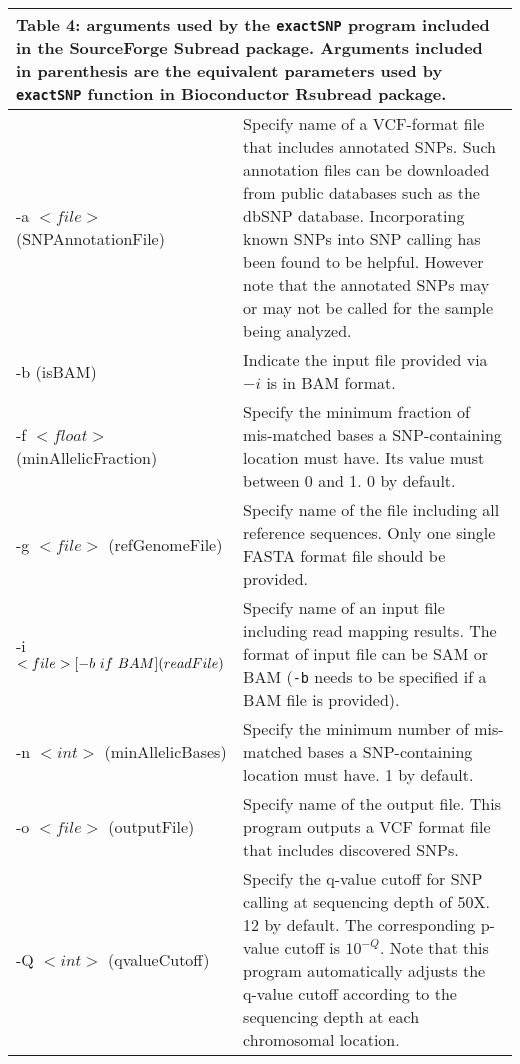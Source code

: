 \documentclass[12pt]{report}
\newcommand{\code}[1]{{\small\texttt{#1}}}
\newcommand{\Subread}{\textsf{Subread}}
\newcommand{\Rsubread}{\textsf{Rsubread}}
\begin{document}
\begin{longtable}{|p{4.5cm}|p{11cm}|}
\multicolumn{2}{p{16cm}}{Table 4: arguments used by the \code{exactSNP} program included in the SourceForge {\Subread} package. 
Arguments included in parenthesis are the equivalent parameters used by \code{exactSNP} function in Bioconductor {\Rsubread} package.}
\endfirsthead
\hline
Arguments & Description \\
\hline
-a $<file>$ \newline (SNPAnnotationFile) & Specify name of a VCF-format file that includes annotated SNPs. Such annotation files can be downloaded from public databases such as the dbSNP database. Incorporating known SNPs into SNP calling has been found to be helpful. However note that the annotated SNPs may or may not be called for the sample being analyzed. \\
\hline
-b \newline (isBAM) & Indicate the input file provided via $-i$ is in BAM format. \\
\hline
-f $<float>$ \newline (minAllelicFraction) & Specify the minimum fraction of mis-matched bases a SNP-containing location must have. Its value must between 0 and 1. 0 by default. \\
\hline
-g $<file>$ \newline (refGenomeFile) & Specify name of the file including all reference sequences. Only one single FASTA format file should be provided. \\
\hline
-i $<file> [-b\ if\ BAM] \newline (readFile)$ & Specify name of an input file including read mapping results. The format of input file can be SAM or BAM  (\code{-b} needs to be specified if a BAM file is provided).\\
\hline
-n $<int>$ \newline (minAllelicBases) & Specify the minimum number of mis-matched bases a SNP-containing location must have. 1 by default.\\
\hline
-o $<file>$ \newline (outputFile) & Specify name of the output file. This program outputs a VCF format file that includes discovered SNPs. \\
\hline
-Q $<int>$  \newline (qvalueCutoff) &  Specify the q-value cutoff for SNP calling at sequencing depth of 50X. 12 by default. The corresponding p-value cutoff is $10^{-Q}$. Note that this program automatically adjusts the q-value cutoff according to the sequencing depth at each chromosomal location.\\

\end{longtable}
\end{document}
